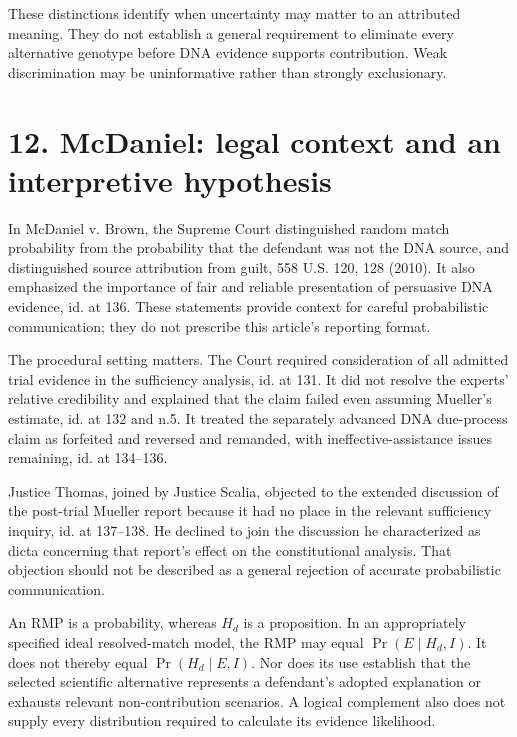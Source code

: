 \documentclass[
]{article}
\begin{document}
These distinctions identify when uncertainty may matter to an attributed
meaning. They do not establish a general requirement to eliminate every
alternative genotype before DNA evidence supports contribution. Weak
discrimination may be uninformative rather than strongly exclusionary.

\section{12. McDaniel: legal context and an interpretive
hypothesis}\label{mcdaniel-legal-context-and-an-interpretive-hypothesis}

In McDaniel v. Brown, the Supreme Court distinguished random match
probability from the probability that the defendant was not the DNA
source, and distinguished source attribution from guilt, 558 U.S. 120,
128 (2010). It also emphasized the importance of fair and reliable
presentation of persuasive DNA evidence, id. at 136. These statements
provide context for careful probabilistic communication; they do not
prescribe this article's reporting format.

The procedural setting matters. The Court required consideration of all
admitted trial evidence in the sufficiency analysis, id. at 131. It did
not resolve the experts' relative credibility and explained that the
claim failed even assuming Mueller's estimate, id. at 132 and n.5. It
treated the separately advanced DNA due-process claim as forfeited and
reversed and remanded, with ineffective-assistance issues remaining, id.
at 134--136.

Justice Thomas, joined by Justice Scalia, objected to the extended
discussion of the post-trial Mueller report because it had no place in
the relevant sufficiency inquiry, id. at 137--138. He declined to join
the discussion he characterized as dicta concerning that report's effect
on the constitutional analysis. That objection should not be described
as a general rejection of accurate probabilistic communication.

An RMP is a probability, whereas \(H_d\) is a proposition. In an
appropriately specified ideal resolved-match model, the RMP may equal
\(\Pr(E\mid H_d,I)\). It does not thereby equal \(\Pr(H_d\mid E,I)\).
Nor does its use establish that the selected scientific alternative
represents a defendant's adopted explanation or exhausts relevant
non-contribution scenarios. A logical complement also does not supply
every distribution required to calculate its evidence likelihood.
\end{document}
